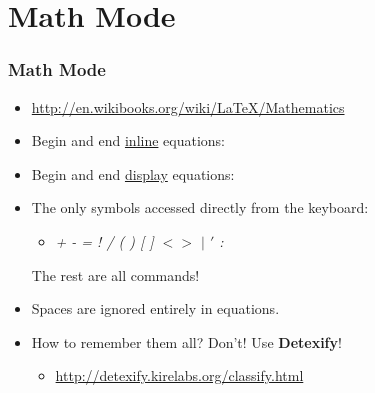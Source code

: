 \documentclass[notes=only]{beamer}
\newcommand{\snip}[1]
{
    
}
\begin{document}
\section{Math Mode}


\begin{frame} \frametitle{Math Mode}
    \begin{itemize}
        \item \url{http://en.wikibooks.org/wiki/LaTeX/Mathematics}
        \item Begin and end \underline{inline} equations: \vspace{-6pt}
        \begin{itemize} \snip{inline.tex} \end{itemize}\vspace{-10pt}
        \item Begin and end \underline{display} equations:
        \begin{itemize} \snip{displayequation.tex} \end{itemize}
        \item The only symbols accessed directly from the keyboard:  
        \begin{itemize} \item \textit{+ - = ! / ( ) [ ] $< >$ $|$ $'$ :} \end{itemize}
        The rest are all commands!
        \item Spaces are ignored entirely in equations.
        \item How to remember them all?  Don't!  Use \textbf{Detexify}!
        \begin{itemize} \item \url{http://detexify.kirelabs.org/classify.html} \end{itemize}
    \end{itemize}
\end{frame}
\end{document}
